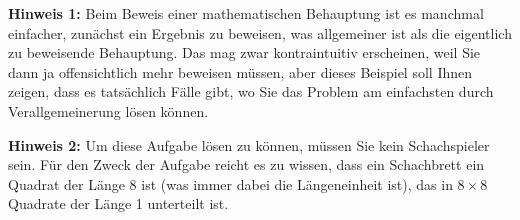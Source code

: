 \noindent  
\textbf{Hinweis 1:}  Beim Beweis einer mathematischen Behauptung ist es manchmal einfacher, zun\"{a}chst  
ein  Ergebnis zu beweisen, was allgemeiner ist als die eigentlich zu beweisende Behauptung.  Das mag  
zwar kontraintuitiv erscheinen, weil Sie dann ja offensichtlich mehr beweisen m\"{u}ssen, aber dieses  
Beispiel soll Ihnen zeigen, dass es tats\"{a}chlich F\"{a}lle gibt, wo Sie das Problem am einfachsten durch  
Verallgemeinerung l\"{o}sen k\"{o}nnen.  
\vspace*{0.2cm}

\noindent
\textbf{Hinweis 2:}  Um diese Aufgabe l\"{o}sen zu k\"{o}nnen, m\"{u}ssen Sie kein Schachspieler sein.
F\"{u}r den Zweck der Aufgabe reicht es zu wissen, dass ein Schachbrett ein Quadrat der L\"{a}nge 8 ist (was immer
dabei die L\"{a}ngeneinheit ist), das in $8 \times 8$ Quadrate der L\"{a}nge 1 unterteilt ist.
\exend  

